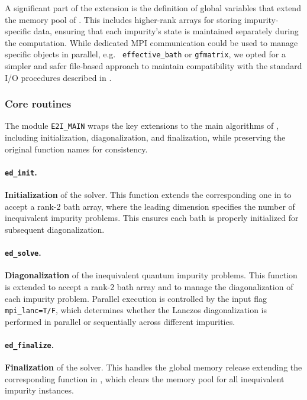 \documentclass[edipack_sp.tex]{subfiles}
\begin{document}
A significant part of the  extension is the 
definition of global variables that extend the memory pool of 
\NAME. This includes higher-rank arrays for storing impurity-specific 
data, ensuring that each impurity's state is maintained separately 
during the computation. While dedicated MPI communication could be 
used to manage specific objects in parallel, e.g. {\tt
  effective\_bath} or {\tt gfmatrix}, we opted for a simpler and safer  
file-based approach to maintain compatibility with the standard I/O 
procedures described in .


\subsubsection{Core routines}\label{ssSecIneqGlobal}
The module {\tt E2I\_MAIN} wraps the key extensions to the main 
algorithms of \NAME, including initialization, diagonalization, and 
finalization, while preserving the original function names for consistency.

\paragraph{{\tt ed\_init}.} {\bf Initialization} of the solver. This function  extends the corresponding one in \NAME  to 
  accept a rank-2 bath array, where the leading dimension specifies 
  the number of inequivalent impurity problems. This ensures each bath 
  is properly initialized for subsequent diagonalization.

\paragraph{{\tt ed\_solve}.} {\bf Diagonalization} of the inequivalent quantum impurity problems. This function is extended to  accept a  
  rank-2 bath array and to manage the diagonalization of each impurity 
  problem. Parallel execution is controlled by the input flag 
  {\tt mpi\_lanc=T/F}, which determines whether the Lanczos 
  diagonalization is performed in parallel or sequentially across 
  different impurities.

\paragraph{{\tt ed\_finalize}.} {\bf Finalization} of the solver. This handles the global memory release extending the corresponding  function in \NAME, which clears the memory pool for all inequivalent impurity instances.
\end{document}
